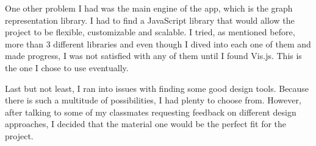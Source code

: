 \documentclass[11pt]{article}
\begin{document}
One other problem I had was the main engine of the app, which is the graph representation library. I had to find a JavaScript library that would allow the project to be flexible, customizable and scalable. I tried, as mentioned before, more than 3 different libraries and even though I dived into each one of them and made progress, I was not satisfied with any of them until I found Vis.js. This is the one I chose to use eventually.

Last but not least, I ran into issues with finding some good design tools. Because there is such a multitude of possibilities, I had plenty to choose from. However, after talking to some of my classmates requesting feedback on different design approaches, I decided that the material one would be the perfect fit for the project.
\end{document}
